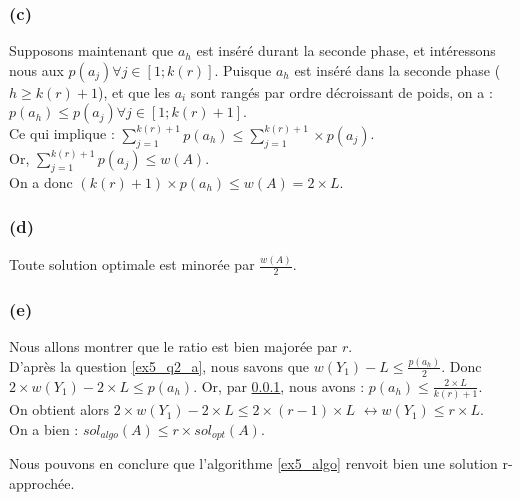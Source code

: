 \subsubsection{(c)}\label{ex5_q2_c}
Supposons maintenant que $a_h$ est inséré durant la seconde phase, et intéressons nous aux 
$p(a_j) \forall j \in [1;k(r)]$. 
Puisque $a_h$ est inséré dans la seconde phase ($h \geq k(r)+1$), et que les $a_i$ sont
rangés par ordre décroissant de poids, on a : $p(a_h) \leq p(a_j) \forall j \in [1;k(r)+1]$.\\
Ce qui implique : $\sum_{j = 1}^{k(r)+1}p(a_h) \leq \sum_{j = 1}^{k(r)+1} \times p(a_j)$.\\
Or, $\sum_{j=1}^{k(r)+1}p(a_j) \leq w(A)$. \\
On a donc $(k(r)+1) \times p(a_h) \leq w(A) = 2 \times L$.

\subsubsection{(d)}\label{ex5_q2_d}
Toute solution optimale est minorée par $\frac{w(A)}{2}$.

\subsubsection{(e)}\label{ex5_q2_e}
Nous allons montrer que le ratio est bien majorée par $r$.\\
D'après la question \ref{ex5_q2_a}, nous savons que $w(Y_1) - L \leq \frac{p(a_h)}{2}$.
Donc $2 \times w(Y_1) - 2 \times L \leq p(a_h)$.
Or, par \ref{ex5_q2_c}, nous avons : $p(a_h) \leq \frac{2\times L}{k(r)+1}$.\\
On obtient alors $2 \times w(Y_1) - 2 \times L \leq 2 \times (r - 1) \times L$
$\leftrightarrow w(Y_1) \leq r \times L$.\\
On a bien : $sol_{algo}(A) \leq r \times sol_{opt}(A)$.

Nous pouvons en conclure que l'algorithme \ref{ex5_algo} renvoit bien une solution
r-approchée.

